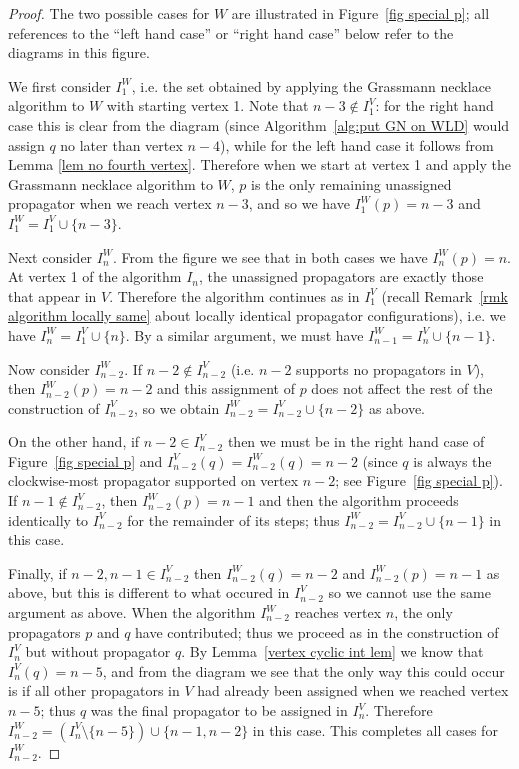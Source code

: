 \documentclass[11pt]{article}
\theoremstyle{remark}
\theoremstyle{definition}
\begin{document}
\begin{proof}

The two possible cases for $W$ are illustrated in Figure~\ref{fig special p}; all references to the ``left hand case'' or ``right hand case'' below refer to the diagrams in this figure.

We first consider $I_1^{W}$, i.e. the set obtained by applying the Grassmann necklace algorithm to $W$ with starting vertex 1. Note that $n-3 \not\in I_1^{V}$: for the right hand case this is clear from the diagram (since Algorithm~\ref{alg:put GN on WLD} would assign $q$ no later than vertex $n-4$), while for the left hand case it follows from Lemma \ref{lem no fourth vertex}. Therefore when we start at vertex 1 and apply the Grassmann necklace algorithm to $W$, $p$ is the only remaining unassigned propagator when we reach vertex $n-3$, and so we have $ I_1^{W}(p) = n-3$ and $I_1^W = I_1^V\cup \{n-3\}$.


Next consider $I_n^{W}$. From the figure we see that in both cases we have $I_n^{W}(p) = n$. At vertex 1 of the algorithm $I_n$, the unassigned propagators are exactly those that appear in $V$. Therefore the algorithm continues as in $I_1^{V}$ (recall Remark~\ref{rmk algorithm locally same} about locally identical propagator configurations), i.e. we have $I_n^{W} = I_1^{V} \cup \{n\}$. By a similar argument, we must have $I_{n-1}^{W} = I_n^{V} \cup \{n-1\}$.

Now consider $I_{n-2}^{W}$. If $n-2\not\in I_{n-2}^{V}$ (i.e. $n-2$ supports no propagators in $V$), then $I_{n-2}^W(p) = n-2$ and this assignment of $p$ does not affect the rest of the construction of $I_{n-2}^{V}$, so we obtain $I_{n-2}^{W} = I_{n-2}^{V}\cup \{n-2\}$ as above.

On the other hand, if $n-2\in I_{n-2}^{V}$ then we must be in the right hand case of Figure~\ref{fig special p} and $I_{n-2}^V(q) = I_{n-2}^W(q) = n-2$ (since $q$ is always the clockwise-most propagator supported on vertex $n-2$; see Figure~\ref{fig special p}). If $n-1 \not\in I_{n-2}^{V}$, then $I_{n-2}^W(p) = n-1$ and then the algorithm proceeds identically to $I_{n-2}^{V}$ for the remainder of its steps; thus $I_{n-2}^{W} = I_{n-2}^{V}\cup \{n-1\}$ in this case.

Finally, if $n-2,n-1 \in I_{n-2}^{V}$ then $I_{n-2}^W(q) = n-2$ and $I_{n-2}^W(p) = n-1$ as above, but this is different to what occured in $I_{n-2}^{V}$ so we cannot use the same argument as above. When the algorithm $I_{n-2}^W$ reaches vertex $n$, the only propagators $p$ and $q$ have contributed; thus we proceed as in the construction of $I_n^{V}$ but without propagator $q$. By Lemma~\ref{vertex cyclic int lem} we know that $I_n^V(q) = n-5$, and from the diagram we see that the only way this could occur is if all other propagators in $V$ had already been assigned when we reached vertex $n-5$; thus $q$ was the final propagator to be assigned in $I_n^{V}$. Therefore $I_{n-2}^{W} = (I_{n}^{V} \setminus \{n-5\}) \cup \{n-1, n-2\}$ in this case. This completes all cases for $I_{n-2}^{W}$.


\end{proof}
\end{document}
